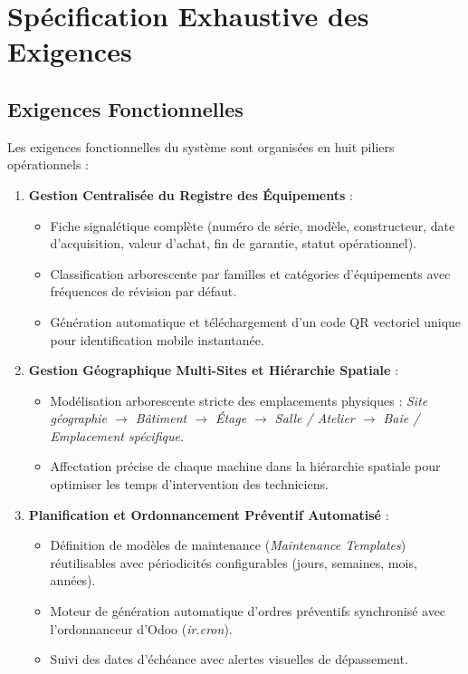 \section{Spécification Exhaustive des Exigences}

\subsection{Exigences Fonctionnelles}
Les exigences fonctionnelles du système sont organisées en huit piliers opérationnels :

\begin{enumerate}[leftmargin=1.2cm, label=\textbf{EF\arabic*.}]
    \item \textbf{Gestion Centralisée du Registre des Équipements} :
    \begin{itemize}
        \item Fiche signalétique complète (numéro de série, modèle, constructeur, date d'acquisition, valeur d'achat, fin de garantie, statut opérationnel).
        \item Classification arborescente par familles et catégories d'équipements avec fréquences de révision par défaut.
        \item Génération automatique et téléchargement d'un code QR vectoriel unique pour identification mobile instantanée.
    \end{itemize}

    \item \textbf{Gestion Géographique Multi-Sites et Hiérarchie Spatiale} :
    \begin{itemize}
        \item Modélisation arborescente stricte des emplacements physiques : \textit{Site géographie $\rightarrow$ Bâtiment $\rightarrow$ Étage $\rightarrow$ Salle / Atelier $\rightarrow$ Baie / Emplacement spécifique}.
        \item Affectation précise de chaque machine dans la hiérarchie spatiale pour optimiser les temps d'intervention des techniciens.
    \end{itemize}

    \item \textbf{Planification et Ordonnancement Préventif Automatisé} :
    \begin{itemize}
        \item Définition de modèles de maintenance (\textit{Maintenance Templates}) réutilisables avec périodicités configurables (jours, semaines, mois, années).
        \item Moteur de génération automatique d'ordres préventifs synchronisé avec l'ordonnanceur d'Odoo (\textit{ir.cron}).
        \item Suivi des dates d'échéance avec alertes visuelles de dépassement.
    \end{itemize}


\end{enumerate}

